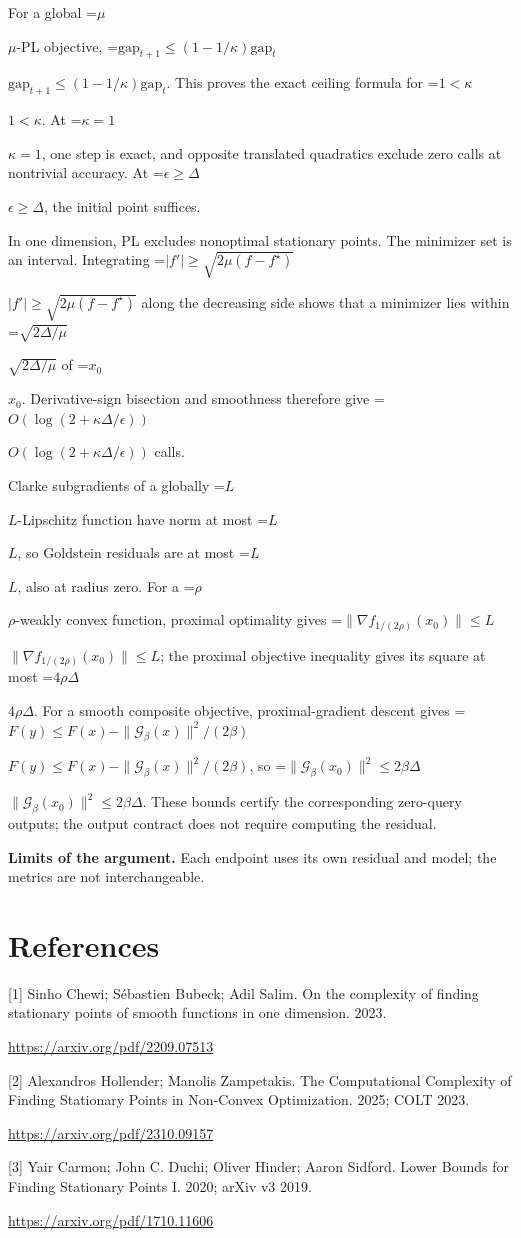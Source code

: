 \documentclass[10pt,a4paper]{article}
\newcommand{\AtlasMath}[1]{\par\begingroup\centering\setbox0=\hbox{$\displaystyle #1$}\ifdim\wd0>1.4\linewidth\typeout{ATLAS WIDE FORMULA: \the\wd0}\fi\ifdim\wd0>\linewidth\resizebox{\linewidth}{!}{\box0}\else\box0\fi\par\endgroup}
\newcommand{\AtlasInlineMath}[1]{\begingroup\setbox0=\hbox{$#1$}\ifdim\wd0>.4\linewidth\endgroup\AtlasMath{#1}\else\endgroup$#1$\fi}
\begin{document}
For a global \AtlasInlineMath{\mu}-PL objective,
\AtlasInlineMath{\mathrm{gap}_{t+1}\le(1-1/\kappa)\mathrm{gap}_t}.
This proves the exact ceiling formula for \AtlasInlineMath{1<\kappa}. At \AtlasInlineMath{\kappa=1}, one step is exact, and opposite translated quadratics exclude zero calls at nontrivial accuracy. At \AtlasInlineMath{\epsilon\ge\Delta}, the initial point suffices.

In one dimension, PL excludes nonoptimal stationary points. The minimizer set is an interval. Integrating
\AtlasInlineMath{|f'|\ge\sqrt{2\mu(f-f^\star)}}
along the decreasing side shows that a minimizer lies within \AtlasInlineMath{\sqrt{2\Delta/\mu}} of \AtlasInlineMath{x_0}. Derivative-sign bisection and smoothness therefore give \AtlasInlineMath{O(\log(2+\kappa\Delta/\epsilon))} calls.

Clarke subgradients of a globally \AtlasInlineMath{L}-Lipschitz function have norm at most \AtlasInlineMath{L}, so Goldstein residuals are at most \AtlasInlineMath{L}, also at radius zero. For a \AtlasInlineMath{\rho}-weakly convex function, proximal optimality gives
\AtlasInlineMath{\|\nabla f_{1/(2\rho)}(x_0)\|\le L}; the proximal objective inequality gives its square at most \AtlasInlineMath{4\rho\Delta}.
For a smooth composite objective, proximal-gradient descent gives
\AtlasInlineMath{F(y)\le F(x)-\|\mathcal G_\beta(x)\|^2/(2\beta)},
so \AtlasInlineMath{\|\mathcal G_\beta(x_0)\|^2\le2\beta\Delta}.
These bounds certify the corresponding zero-query outputs; the output contract does not require computing the residual.

\textbf{Limits of the argument.} Each endpoint uses its own residual and model; the metrics are not interchangeable.

\section{References}
[1] Sinho Chewi; Sébastien Bubeck; Adil Salim. On the complexity of finding stationary points of smooth functions in one dimension. 2023.

\url{https://arxiv.org/pdf/2209.07513}

[2] Alexandros Hollender; Manolis Zampetakis. The Computational Complexity of Finding Stationary Points in Non-Convex Optimization. 2025; COLT 2023.

\url{https://arxiv.org/pdf/2310.09157}

[3] Yair Carmon; John C. Duchi; Oliver Hinder; Aaron Sidford. Lower Bounds for Finding Stationary Points I. 2020; arXiv v3 2019.

\url{https://arxiv.org/pdf/1710.11606}
\end{document}
